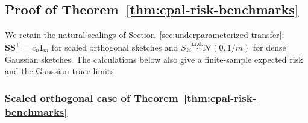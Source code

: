 \documentclass{article}
\theoremstyle{plain}
\theoremstyle{definition}
\theoremstyle{definition}
\def\mathbold{\boldsymbol}
\def\cal{\mathcal}
\def\bI{\mathbold{I}}\def\hbI{{\widehat{\bI}}}\def\tbI{{\widetilde{\bI}}}
\def\calN{{\cal N}}\def\scrN{{\mathscr N}}\def\Nhat{\widehat{N}}\def\Ntil{{\widetilde N}}\def\Nbar{{\overline N}}
\def\bS{\mathbold{S}}\def\hbS{{\widehat{\bS}}}\def\tbS{{\widetilde{\bS}}}
\begin{document}
\subsection{Proof of Theorem~\ref{thm:cpal-risk-benchmarks}}
\label{app:concrete-underparameterized-proofs}

We retain the natural scalings of Section~\ref{sec:underparameterized-transfer}:
$\bS\bS^\top=c_n\bI_m$ for scaled orthogonal sketches and
$S_{ki}\stackrel{\mathrm{i.i.d.}}{\sim}\calN(0,1/m)$ for dense Gaussian
sketches. The calculations below also give a finite-sample expected risk
and the Gaussian trace limits.

\subsubsection{Scaled orthogonal case of Theorem~\ref{thm:cpal-risk-benchmarks}}
\label{app:proof-tight-frame-risk}
\end{document}
